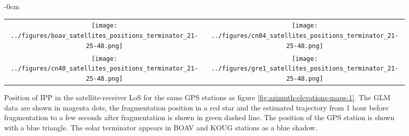 \begin{figure*}
\begin{adjustwidth}{-\extralength}{0cm}
    \centering
    \begin{tabular}{cc}
    \texttt{[image: ../figures/boav\_satellites\_positions\_terminator\_21-25-48.png]} & \texttt{[image: ../figures/cn04\_satellites\_positions\_terminator\_21-25-48.png]}\\
    \texttt{[image: ../figures/cn40\_satellites\_positions\_terminator\_21-25-48.png]} & \texttt{[image: ../figures/gre1\_satellites\_positions\_terminator\_21-25-48.png]} %
    \end{tabular}
    \end{adjustwidth}
    \caption{Position of IPP in the satellite-receiver LoS for the same GPS stations as figure \ref{fig:azimuth-elevations-maps-1}. The GLM data are shown in magenta dots, the fragmentation position in a red star and the estimated trajectory from 1 hour before fragmentation to a few seconds after fragmentation is shown in green dashed line. The position of the GPS station is shown with a blue triangle. The solar terminator appears in BOAV and KOUG stations as a blue shadow.}
    \label{fig:satellites-and-terminator}
\end{figure*}




